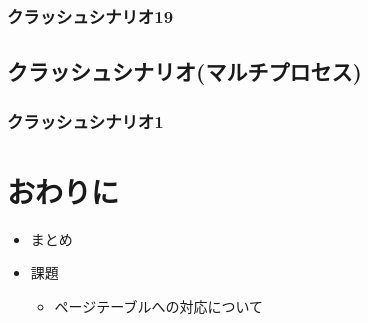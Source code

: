 \documentclass[10.5ptj,a4j]{ltjsarticle}
\providecommand{\tightlist}{%
  \setlength{\itemsep}{0pt}\setlength{\parskip}{0pt}}
\begin{document}
\subsubsection{クラッシュシナリオ19}
\subsection{クラッシュシナリオ(マルチプロセス)}
\subsubsection{クラッシュシナリオ1}


\section{おわりに}
\begin{itemize}\tightlist{}
  \item まとめ
  \item 課題
  \begin{itemize}\tightlist{}
    \item ページテーブルへの対応について
  \end{itemize}
\end{itemize}
%
%
\end{document}
